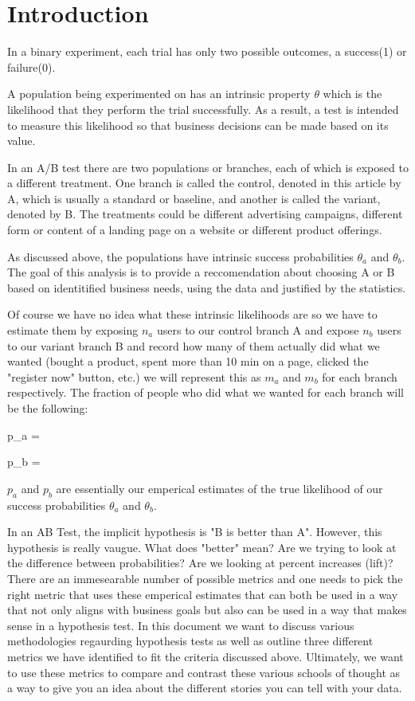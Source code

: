 
\section{Introduction\label{sec:Intro}}

In a binary experiment, each trial has only two possible outcomes, a success(1) or failure(0).

A population being experimented on has an intrinsic property $\theta$ which is the likelihood 
that they perform the trial successfully. As a result, a test is intended to measure this
likelihood so that business decisions can be made based on its value.

In an A/B test there are two populations or branches, each of which is exposed to a different 
treatment. One branch is called the control, denoted in this article by A, which is usually a standard or baseline, 
and another is called the variant, denoted by B. The treatments could be different advertising campaigns, 
different form or content of a landing page on a website or different product offerings.

As discussed above, the populations have intrinsic success probabilities $\theta_a$ and $\theta_b$. 
The goal of this analysis is to provide a reccomendation about choosing A or B based on identitified 
business needs, using the data and justified by the statistics. 

Of course we have no idea what these intrinsic likelihoods are so we have to estimate them by exposing $n_a$ users
to our control branch A and expose $n_b$ users to our variant branch B and record how many of them actually
did what we wanted (bought a product, spent more than 10 min on a page, clicked the "register now" button, etc.)
we will represent this as $m_a$ and $m_b$ for each branch respectively. The fraction of people who did what we wanted
for each branch will be the following: 

\beq
\label{pa}
p_a = 
\eeq

\beq
p_b = 
\eeq

$p_a$ and $p_b$ are essentially our emperical estimates of the true likelihood of our success probabilities $\theta_a$ and $\theta_b$. 

In an AB Test, the implicit hypothesis is "B is better than A". However, this hypothesis is really
vaugue. What does "better" mean? Are we trying to look at the difference between probabilities? Are we looking at percent increases (lift)? 
There are an immesearable number of possible metrics and one needs to pick the right metric that uses these emperical estimates that can both 
be used in a way that not only aligns with business goals but also can be used in a way that makes sense in a hypothesis test. 
In this document we want to discuss various methodologies regaurding hypothesis tests as well as outline three different metrics we have 
identified to fit the criteria discussed above. Ultimately, we want to use these metrics to compare and contrast these various schools of 
thought as a way to give you an idea about the different stories you can tell with your data.

